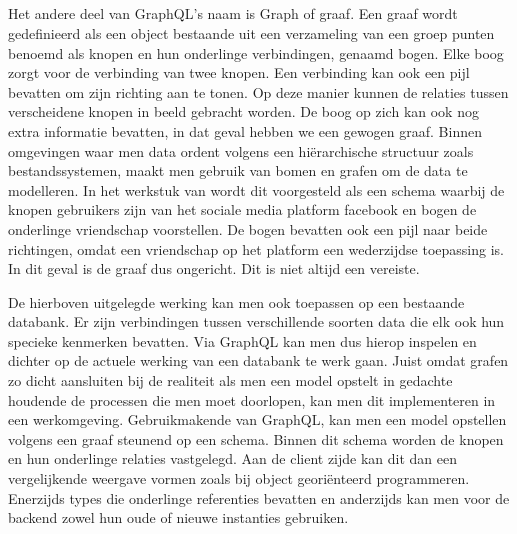 \subsection{}%
\label{sec:graaf}
Het andere deel van GraphQL's naam is Graph of graaf. Een graaf wordt gedefinieerd als een object bestaande uit een verzameling van een groep punten benoemd als knopen en hun onderlinge verbindingen, genaamd bogen. Elke boog zorgt voor de verbinding van twee knopen. Een verbinding kan ook een pijl bevatten om zijn richting aan te tonen. Op deze manier kunnen de relaties tussen verscheidene knopen in beeld gebracht worden. De boog op zich kan ook nog extra informatie bevatten, in dat geval hebben we een gewogen graaf. Binnen omgevingen waar men data ordent volgens een hiërarchische structuur zoals bestandssystemen, maakt men gebruik van bomen en grafen om de data te modelleren.\autocite{Lievens2021} In het werkstuk van \textcite{Brysbaert2021} wordt dit voorgesteld als een schema waarbij de knopen gebruikers zijn van het sociale media platform facebook en bogen de onderlinge vriendschap voorstellen. De bogen bevatten ook een pijl naar beide richtingen, omdat een vriendschap op het platform een wederzijdse toepassing is. In dit geval is de graaf dus ongericht. Dit is niet altijd een vereiste.

De hierboven uitgelegde werking kan men ook toepassen op een bestaande databank. Er zijn verbindingen tussen verschillende soorten data die elk ook hun specieke kenmerken bevatten. Via GraphQL kan men dus hierop inspelen en dichter op de actuele werking van een databank te werk gaan.
Juist omdat grafen zo dicht aansluiten bij de realiteit als men een model opstelt in gedachte houdende de processen die men moet doorlopen, kan men dit implementeren in een werkomgeving. Gebruikmakende van GraphQL, kan men een model opstellen volgens een graaf steunend op een schema. Binnen dit schema worden de knopen en hun onderlinge relaties vastgelegd. Aan de client zijde kan dit dan een vergelijkende weergave vormen zoals bij object georiënteerd programmeren. Enerzijds types die onderlinge referenties bevatten en anderzijds kan men voor de backend zowel hun oude of nieuwe instanties gebruiken.\autocite{GraphQLFoundation2022}

